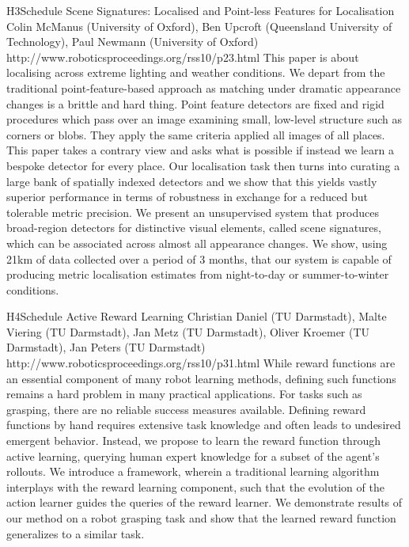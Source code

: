 \begin{spacing}{1.0}
\descriptionPaper
{H3}{Schedule}
{	
Scene Signatures: Localised and Point-less Features for Localisation
}
{
Colin McManus (University of Oxford), Ben Upcroft (Queensland University of Technology), Paul Newmann (University of Oxford)
}
{
http://www.roboticsproceedings.org/rss10/p23.html
}
{
This paper is about localising across extreme lighting and weather conditions. We depart from the traditional point-feature-based approach as matching under dramatic appearance changes is a brittle and hard thing. Point feature detectors are fixed and rigid procedures which pass over an image examining small, low-level structure such as corners or blobs. They apply the same criteria applied all images of all places. This paper takes a contrary view and asks what is possible if instead we learn a bespoke detector for every place. Our localisation task then turns into curating a large bank of spatially indexed detectors and we show that this yields vastly superior performance in terms of robustness in exchange for a reduced but tolerable metric precision. We present an unsupervised system that produces broad-region detectors for distinctive visual elements, called scene signatures, which can be associated across almost all appearance changes. We show, using 21km of data collected over a period of 3 months, that our system is capable of producing metric localisation estimates from night-to-day or summer-to-winter conditions.
}



\descriptionPaper
{H4}{Schedule}
{	
Active Reward Learning 
}
{
Christian Daniel (TU Darmstadt), Malte Viering (TU Darmstadt), Jan Metz (TU Darmstadt), Oliver Kroemer (TU Darmstadt), Jan Peters (TU Darmstadt)
}
{
http://www.roboticsproceedings.org/rss10/p31.html
}
{
While reward functions are an essential component of many robot learning methods, defining such functions remains a hard problem in many practical applications. For tasks such as grasping, there are no reliable success measures available. Defining reward functions by hand requires extensive task knowledge and often leads to undesired emergent behavior. Instead, we propose to learn the reward function through active learning, querying human expert knowledge for a subset of the agent's rollouts. We introduce a framework, wherein a traditional learning algorithm interplays with the reward learning component, such that the evolution of the action learner guides the queries of the reward learner. We demonstrate results of our method on a robot grasping task and show that the learned reward function generalizes to a similar task.
}




\end{spacing}
